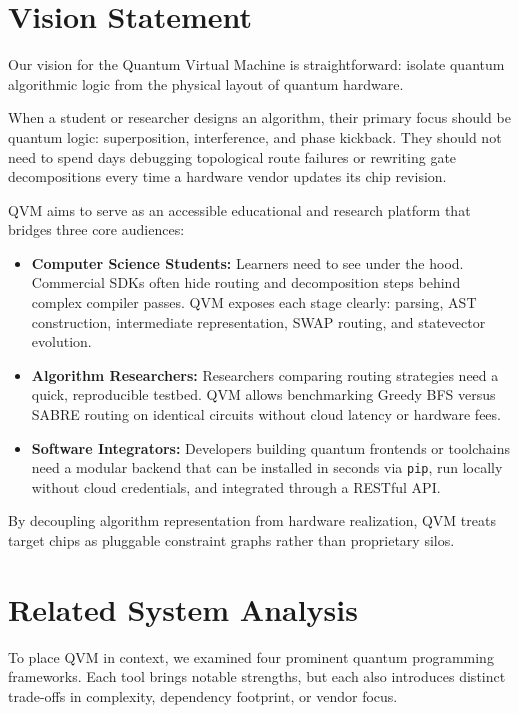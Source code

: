 \section{Vision Statement}

Our vision for the Quantum Virtual Machine is straightforward: isolate quantum algorithmic logic from the physical layout of quantum hardware.

When a student or researcher designs an algorithm, their primary focus should be quantum logic: superposition, interference, and phase kickback. They should not need to spend days debugging topological route failures or rewriting gate decompositions every time a hardware vendor updates its chip revision. 

QVM aims to serve as an accessible educational and research platform that bridges three core audiences:
\begin{itemize}[leftmargin=*]
    \item \textbf{Computer Science Students:} Learners need to see under the hood. Commercial SDKs often hide routing and decomposition steps behind complex compiler passes. QVM exposes each stage clearly: parsing, AST construction, intermediate representation, SWAP routing, and statevector evolution.
    \item \textbf{Algorithm Researchers:} Researchers comparing routing strategies need a quick, reproducible testbed. QVM allows benchmarking Greedy BFS versus SABRE routing on identical circuits without cloud latency or hardware fees.
    \item \textbf{Software Integrators:} Developers building quantum frontends or toolchains need a modular backend that can be installed in seconds via \texttt{pip}, run locally without cloud credentials, and integrated through a RESTful API.
\end{itemize}

By decoupling algorithm representation from hardware realization, QVM treats target chips as pluggable constraint graphs rather than proprietary silos.


\section{Related System Analysis}

To place QVM in context, we examined four prominent quantum programming frameworks. Each tool brings notable strengths, but each also introduces distinct trade-offs in complexity, dependency footprint, or vendor focus.

